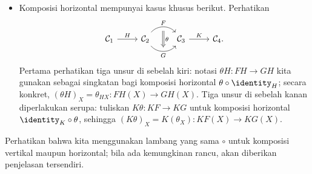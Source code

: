 \begin{itemize}
\begin{equation}
\begin{tikzcd}
		G_1 F_1(X) \arrow[r, "{\psi_{F_1 X}}"] \arrow[d, "{G_1(\theta_X)}"'] & G_2 F_1(X) \arrow[d, "{G_2(\theta_X)}"] \\
		G_1 F_2(X) \arrow[r, "{\psi_{F_2 X}}"'] & G_2 F_2(X)
	\end{tikzcd}\end{equation}
	komutatif. Komposisi sepanjang diagonal $\searrow$ dinotasikan dengan $(\psi \circ \theta)_X : G_1 F_1 (X) \to G_2 F_2 (X)$; inilah komposisi horizontal yang dikehendaki. Kita akan segera membuktikan naturalitasnya, dan pembaca dapat memanfaatkan kesempatan ini untuk membiasakan diri menggunakan diagram komutatif. Diagramnya ialah:
	\[ \begin{tikzcd}
		\mathcal{C}'' \arrow[bend left=50, r, "F_1", ""' name=LU] \arrow[bend right=50, r, "" name=LD, "F_2"'] &
		\mathcal{C}' \arrow[bend left=50, r, "G_1", ""' name=RU] \arrow[bend right=50, r, "" name=RD, "G_2"'] &
		\arrow[Rightarrow, to path=(LU) -- (LD) \tikztonodes, "\theta"] \arrow[Rightarrow, to path=(RU) -- (RD) \tikztonodes, "\psi"] \mathcal{C}
	\end{tikzcd} \quad \text{dikomposisikan menjadi} \quad \begin{tikzcd}
		\mathcal{C}''
		\arrow[bend left=50, rr, "G_1 F_1", ""' name=U]
		\arrow[bend right=50, rr, "" name=D, "G_2 F_2"']
		& & \arrow[Rightarrow, to path=(U) -- (D) \tikztonodes, "\psi \circ \theta"] \mathcal{C} .
	\end{tikzcd} \]
	\item Komposisi horizontal mempunyai kasus khusus berikut. Perhatikan
	\[\begin{tikzcd}
		\mathcal{C}_1 \arrow[r, "H"] & \mathcal{C}_2 \arrow[bend left=50, r, "F", ""' name=U] \arrow[bend right=50, r, "" name=D, "G"'] & \mathcal{C}_3 \arrow[Rightarrow, to path=(U)--(D) \tikztonodes, "\theta"] \arrow[r, "K"] & \mathcal{C}_4 .
    \end{tikzcd} \]
	Pertama perhatikan tiga unsur di sebelah kiri: notasi $\theta H: FH \to GH$ kita gunakan sebagai singkatan bagi komposisi horizontal $\theta \circ \identity_{H}$; secara konkret, $(\theta H)_X = \theta_{HX} : FH(X) \to GH(X)$. Tiga unsur di sebelah kanan diperlakukan serupa: tuliskan $K\theta: KF \to KG$ untuk komposisi horizontal $\identity_K \circ \theta$, sehingga $(K\theta)_X = K(\theta_X): KF(X) \to KG(X)$.
\end{itemize}
Perhatikan bahwa kita menggunakan lambang yang sama $\circ$ untuk komposisi vertikal maupun horizontal; bila ada kemungkinan rancu, akan diberikan penjelasan tersendiri.


